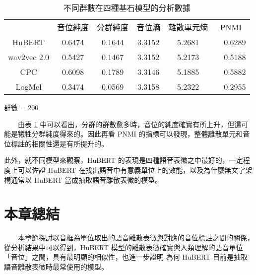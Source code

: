\begin{table}[!htbp]
            \begin{subtable}[t]{\textwidth}
                \centering
                \begin{tabular}{cccccc}
                                & 音位純度 & 分群純度 & 音位熵 & 離散單元熵 &    PNMI \\
                    HuBERT      &   0.6474 &   0.1644 & 3.3152 &     5.2681 &　0.6289 \\   %
                    wav2vec 2.0 &   0.5427 &   0.1467 & 3.3152 &     5.2173 &　0.5188 \\   %
                    CPC         &   0.6098 &   0.1789 & 3.3146 &     5.1885 &　0.5882 \\   %
                    LogMel      &   0.3474 &   0.0569 & 3.3158 &     5.2322 &　0.2955 \\   %
                \end{tabular}
                \caption{群數 = 200}
                \label{tab:ch3-clu200}
            \end{subtable}        

            \caption{不同群數在四種基石模型的分析數據}
            \label{tab:single-cluster-results}
        \end{table}

　　由表 \ref{tab:single-cluster-results} 中可以看出，分群的群數愈多時，音位的純度確實有所上升，但這可能是犧牲分群純度得來的。因此再看 PNMI 的指標可以發現，整體離散單元和音位標註的相關性還是有所提升的。

        此外，就不同模型來觀察，HuBERT 的表現是四種語音表徵之中最好的，一定程度上可以佐證 HuBERT 在找出語音中有意義單位上的效能，以及為什麼無文字架構通常以 HuBERT 當成抽取語音離散表徵的模型。



\section{本章總結}

　　本章節探討以音框為單位取出的語音離散表徵與對應的音位標註之間的關係，從分析結果中可以得到，HuBERT 模型的離散表徵確實與人類理解的語音單位「音位」之間，具有最明顯的相似性，也進一步證明
為何 HuBERT 目前是抽取語音離散表徵時最常使用的模型。
